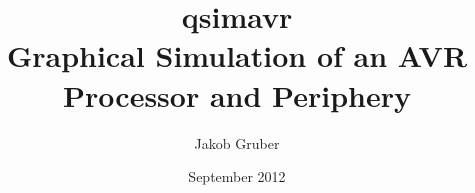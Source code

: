 
\title{qsimavr \\ Graphical Simulation of an AVR Processor and Periphery}
\author{Jakob Gruber}
\address{Kirschenallee 6/1, A-2120 Obersdorf}
\date{September 2012}


